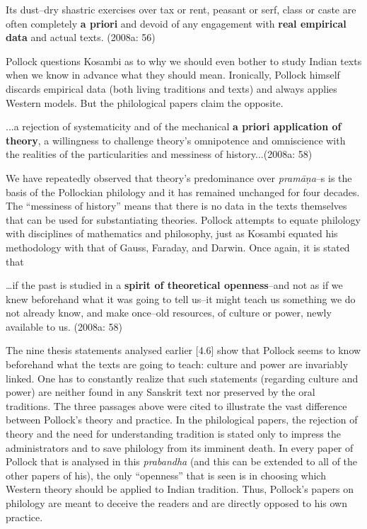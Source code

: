 \begin{myquote}
Its dust–dry shastric exercises over tax or rent, peasant or serf, class or caste are often completely \textbf{a priori} and devoid of any engagement with \textbf{real empirical data} and actual texts. (2008a: 56)
\end{myquote}

Pollock questions Kosambi as to why we should even bother to study Indian texts when we know in advance what they should mean. Ironically, Pollock himself discards empirical data (both living traditions and texts) and always applies Western models. But the philological papers claim the opposite.

\begin{myquote}
...a rejection of systematicity and of the mechanical \textbf{a priori application of theory}, a willingness to challenge theory’s omnipotence and omniscience with the realities of the particularities and messiness of history...(2008a: 58)
\end{myquote}

We have repeatedly observed that theory’s predominance over \textit{pramāṇa}–s is the basis of the Pollockian philology and it has remained unchanged for four decades. The “messiness of history” means that there is no data in the texts themselves that can be used for substantiating theories. Pollock attempts to equate philology with disciplines of mathematics and philosophy, just as Kosambi equated his methodology with that of Gauss, Faraday, and Darwin. Once again, it is stated that

\begin{myquote}
…if the past is studied in a \textbf{spirit of theoretical openness}–and not as if we knew beforehand what it was going to tell us–it might teach us something we do not already know, and make once–old resources, of culture or power, newly available to us. (2008a: 58)
\end{myquote}

The nine thesis statements analysed earlier [4.6] show that Pollock seems to know beforehand what the texts are going to teach: culture and power are invariably linked. One has to constantly realize that such statements (regarding culture and power) are neither found in any Sanskrit text nor preserved by the oral traditions. The three passages above were cited to illustrate the vast difference between Pollock’s theory and practice. In the philological papers, the rejection of theory and the need for understanding tradition is stated only to impress the administrators and to save philology from its imminent death. In every paper of Pollock that is analysed in this \textit{prabandha }(and this can be extended to all of the other papers of his), the only “openness” that is seen is in choosing which Western theory should be applied to Indian tradition. Thus, Pollock’s papers on philology are meant to deceive the readers and are directly opposed to his own practice.

